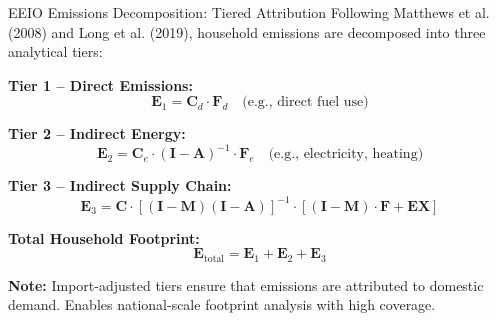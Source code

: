 \documentclass{beamer}
\begin{document}
\begin{frame}{EEIO Emissions Decomposition: Tiered Attribution}
\footnotesize
\vspace{-2.0em}
Following Matthews et al. (2008) and Long et al. (2019), household emissions are decomposed into three analytical tiers:

\vspace{0.5em}
\textbf{Tier 1 – Direct Emissions:}
\[
\mathbf{E}_1 = \mathbf{C}_d \cdot \mathbf{F}_d
\quad \text{(e.g., direct fuel use)}
\]

\textbf{Tier 2 – Indirect Energy:}
\[
\mathbf{E}_2 = \mathbf{C}_e \cdot (\mathbf{I} - \mathbf{A})^{-1} \cdot \mathbf{F}_e
\quad \text{(e.g., electricity, heating)}
\]

\textbf{Tier 3 – Indirect Supply Chain:}
\[
\mathbf{E}_3 = \mathbf{C} \cdot \left[(\mathbf{I} - \mathbf{M})(\mathbf{I} - \mathbf{A})\right]^{-1} \cdot \left[(\mathbf{I} - \mathbf{M}) \cdot \mathbf{F} + \mathbf{EX}\right]
\]

\vspace{0.5em}
\textbf{Total Household Footprint:}
\[
\mathbf{E}_{\text{total}} = \mathbf{E}_1 + \mathbf{E}_2 + \mathbf{E}_3
\]

\vspace{0.5em}
\textbf{Note:}  
Import-adjusted tiers ensure that emissions are attributed to domestic demand. Enables national-scale footprint analysis with high coverage.

\end{frame}
\end{document}
